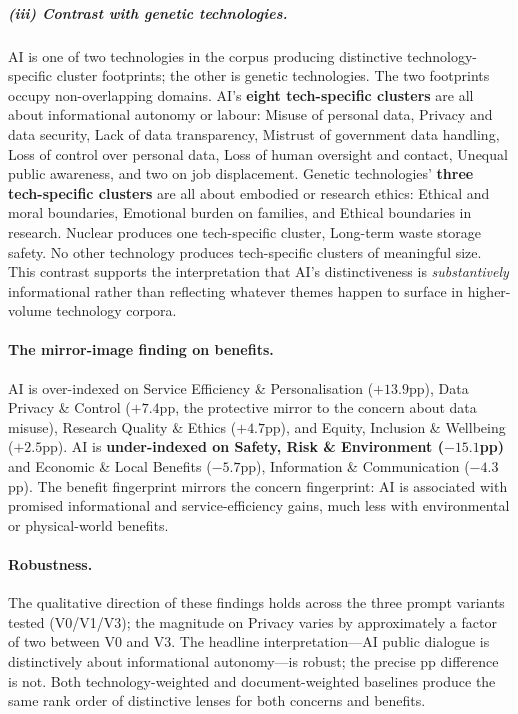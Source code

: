 \documentclass[11pt, a4paper]{article}
\begin{document}
\subparagraph{(iii) Contrast with genetic technologies.}  AI is one of
two technologies in the corpus producing distinctive technology-specific
cluster footprints; the other is genetic technologies.  The two
footprints occupy non-overlapping domains.  AI's \textbf{eight
tech-specific clusters} are all about informational autonomy or labour:
Misuse of personal data, Privacy and data security, Lack of data
transparency, Mistrust of government data handling, Loss of control over
personal data, Loss of human oversight and contact, Unequal public
awareness, and two on job displacement.  Genetic technologies'
\textbf{three tech-specific clusters} are all about embodied or research
ethics: Ethical and moral boundaries, Emotional burden on families, and
Ethical boundaries in research.  Nuclear produces one tech-specific
cluster, Long-term waste storage safety.  No other technology produces
tech-specific clusters of meaningful size.  This contrast supports the
interpretation that AI's distinctiveness is \emph{substantively}
informational rather than reflecting whatever themes happen to surface in
higher-volume technology corpora.

\paragraph{The mirror-image finding on benefits.}  AI is over-indexed on
Service Efficiency \& Personalisation ($+13.9$pp), Data Privacy \&
Control ($+7.4$pp, the protective mirror to the concern about data
misuse), Research Quality \& Ethics ($+4.7$pp), and Equity, Inclusion
\& Wellbeing ($+2.5$pp).  AI is \textbf{under-indexed on Safety, Risk
\& Environment ($-15.1$pp)} and Economic \& Local Benefits ($-5.7$pp),
Information \& Communication ($-4.3$pp).  The benefit fingerprint
mirrors the concern fingerprint: AI is associated with promised
informational and service-efficiency gains, much less with environmental
or physical-world benefits.

\paragraph{Robustness.}  The qualitative direction of these findings
holds across the three prompt variants tested (V0/V1/V3); the magnitude
on Privacy varies by approximately a factor of two between V0 and V3\@.
The headline interpretation---AI public dialogue is distinctively about
informational autonomy---is robust; the precise pp difference is not.
Both technology-weighted and document-weighted baselines produce the
same rank order of distinctive lenses for both concerns and benefits.
\end{document}
